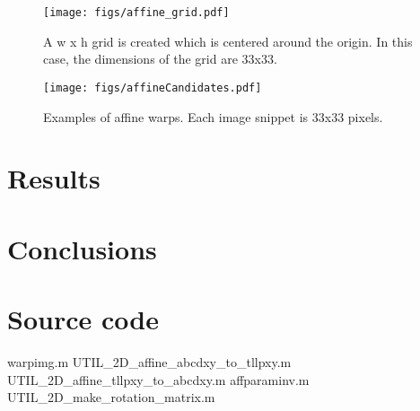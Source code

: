 								\begin{figure}
								\centering
								\texttt{[image: figs/affine\_grid.pdf]}
								\caption{A w x h grid is created which is centered around the origin.  In this case, the dimensions of the grid are 33x33.}
								\end{figure}


								\begin{figure}
								\centering
								\texttt{[image: figs/affineCandidates.pdf]}
								\caption{Examples of affine warps.  Each image snippet is 33x33 pixels.}
								\end{figure}





\section{Results}


\section{Conclusions}



\newpage
\appendix
\section{Source code}
\label{Sec:sourceCode}
\scriptsize
									{warpimg.m}
		{UTIL_2D_affine_abcdxy_to_tllpxy.m}
		{UTIL_2D_affine_tllpxy_to_abcdxy.m}
								{affparaminv.m}
			{UTIL_2D_make_rotation_matrix.m}




